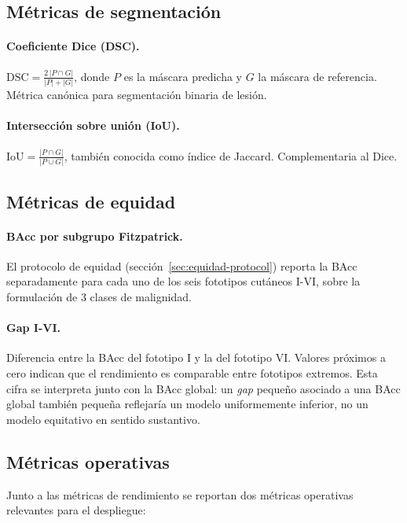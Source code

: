 \subsection{Métricas de segmentación}
\label{sec:metricas-segm}

\paragraph{Coeficiente Dice (DSC).}
$\mathrm{DSC} = \frac{2\,|P \cap G|}{|P| + |G|}$,
donde $P$ es la máscara predicha y $G$ la máscara de referencia.
Métrica canónica para segmentación binaria de lesión.

\paragraph{Intersección sobre unión (IoU).}
$\mathrm{IoU} = \frac{|P \cap G|}{|P \cup G|}$,
también conocida como índice de Jaccard. Complementaria al Dice.

\subsection{Métricas de equidad}
\label{sec:metricas-equidad}

\paragraph{BAcc por subgrupo Fitzpatrick.} El protocolo de equidad
(sección~\ref{sec:equidad-protocol}) reporta la BAcc separadamente
para cada uno de los seis fototipos cutáneos I-VI, sobre la
formulación de 3 clases de malignidad.

\paragraph{Gap I-VI.} Diferencia entre la BAcc del fototipo I y la
del fototipo VI. Valores próximos a cero indican que el rendimiento
es comparable entre fototipos extremos. Esta cifra se interpreta
junto con la BAcc global: un \emph{gap} pequeño asociado a una
BAcc global también pequeña reflejaría un modelo uniformemente
inferior, no un modelo equitativo en sentido sustantivo.

\subsection{Métricas operativas}
\label{sec:metricas-operativas}

Junto a las métricas de rendimiento se reportan dos métricas
operativas relevantes para el despliegue:

